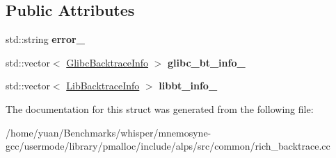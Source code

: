 \subsection*{Public Attributes}
\begin{DoxyCompactItemize}
\item 
std\+::string {\bfseries error\+\_\+}\hypertarget{structalps_1_1BacktraceContext_a07243a40f28635c9fd8a7142458f5d03}{}\label{structalps_1_1BacktraceContext_a07243a40f28635c9fd8a7142458f5d03}

\item 
std\+::vector$<$ \hyperlink{structalps_1_1BacktraceContext_1_1GlibcBacktraceInfo}{Glibc\+Backtrace\+Info} $>$ {\bfseries glibc\+\_\+bt\+\_\+info\+\_\+}\hypertarget{structalps_1_1BacktraceContext_a6209c0529da5d3ee7a9ffc15cd68cfdc}{}\label{structalps_1_1BacktraceContext_a6209c0529da5d3ee7a9ffc15cd68cfdc}

\item 
std\+::vector$<$ \hyperlink{structalps_1_1BacktraceContext_1_1LibBacktraceInfo}{Lib\+Backtrace\+Info} $>$ {\bfseries libbt\+\_\+info\+\_\+}\hypertarget{structalps_1_1BacktraceContext_a4b87abda6b6d9f3ce5e6096269a61500}{}\label{structalps_1_1BacktraceContext_a4b87abda6b6d9f3ce5e6096269a61500}

\end{DoxyCompactItemize}


The documentation for this struct was generated from the following file\+:\begin{DoxyCompactItemize}
\item 
/home/yuan/\+Benchmarks/whisper/mnemosyne-\/gcc/usermode/library/pmalloc/include/alps/src/common/rich\+\_\+backtrace.\+cc\end{DoxyCompactItemize}

